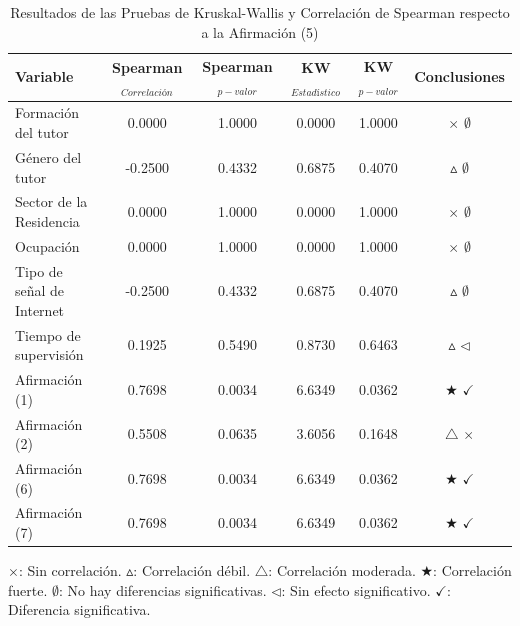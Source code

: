 \documentclass[a4paper,fleqn]{cas-sc}
\begin{document}
				\begin{table}[h!]
					\centering
					\caption{Resultados de las Pruebas de Kruskal-Wallis y Correlación de Spearman respecto a la Afirmación (5)}
					\begin{tabularx}{\textwidth}{Xccccc}
						\toprule
						\textbf{Variable} & \textbf{Spearman$_{Correlación}$} & \textbf{Spearman$_{p-valor}$} & \textbf{KW$_{Estadístico}$} & \textbf{KW$_{p-valor}$} & \textbf{Conclusiones} \\
						\midrule
						Formación del tutor & 0.0000 & 1.0000 & 0.0000 & 1.0000 & \(\times\) \(\emptyset\) \\ %
						Género del tutor & -0.2500 & 0.4332 & 0.6875 & 0.4070 & \(\vartriangle\) \(\emptyset\) \\ %
						Sector de la Residencia & 0.0000 & 1.0000 & 0.0000 & 1.0000 & \(\times\) \(\emptyset\) \\ %
						Ocupación & 0.0000 & 1.0000 & 0.0000 & 1.0000 & \(\times\) \(\emptyset\) \\ %
						Tipo de señal de Internet & -0.2500 & 0.4332 & 0.6875 & 0.4070 & \(\vartriangle\) \(\emptyset\) \\ %
						Tiempo de supervisión & 0.1925 & 0.5490 & 0.8730 & 0.6463 & \(\vartriangle\) \(\triangleleft\) \\ %
						Afirmación (1) & 0.7698 & 0.0034 & 6.6349 & 0.0362 & \(\bigstar\) \(\checkmark\) \\ %
						Afirmación (2) & 0.5508 & 0.0635 & 3.6056 & 0.1648 & \(\triangle\) \(\times\) \\ %
						Afirmación (6) & 0.7698 & 0.0034 & 6.6349 & 0.0362 & \(\bigstar\) \(\checkmark\) \\ %
						Afirmación (7) & 0.7698 & 0.0034 & 6.6349 & 0.0362 & \(\bigstar\) \(\checkmark\) \\ %
						\bottomrule
					\end{tabularx}
					\label{table:kruskal-spearman-results}
					\parbox{\textwidth}{\footnotesize 
						\(\times\): Sin correlación. \(\vartriangle\): Correlación débil. \(\triangle\): Correlación moderada. \(\bigstar\): Correlación fuerte. \(\emptyset\): No hay diferencias significativas.  \(\triangleleft\): Sin efecto significativo. \(\checkmark\): Diferencia significativa.
					}
				\end{table}
				
\end{document}
